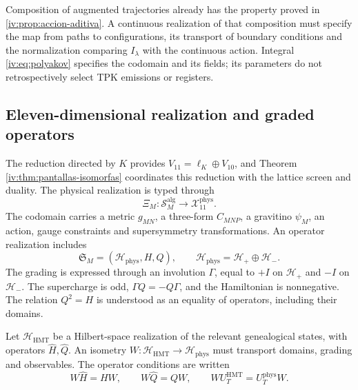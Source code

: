 Composition of augmented trajectories already has the
property proved in \ref{iv:prop:accion-aditiva}.
A continuous realization of that composition must
specify the map from paths to configurations,
its transport of boundary conditions and the
normalization comparing \(I_\lambda\) with the continuous
action. Integral \eqref{iv:eq:polyakov} specifies
the codomain and its fields; its parameters do not
retrospectively select TPK emissions or registers.

\subsection{Eleven-dimensional realization and graded operators}

The reduction directed by \(K\) provides
\(V_{11}=\ell_K\oplus V_{10}\), and Theorem
\ref{iv:thm:pantallas-isomorfas} coordinates this reduction
with the lattice screen and duality. The physical
realization is typed through
\[
 \Xi_M:\mathscr S_M^{\mathrm{alg}}
                  \longrightarrow\mathcal X_{11}^{\mathrm{phys}}.
\]
The codomain carries a metric \(g_{MN}\), a three-form
\(C_{MNP}\), a gravitino \(\psi_M\), an action,
gauge constraints and supersymmetry
transformations. An operator realization includes
\[
 \mathfrak S_M=(\mathcal H_{\mathrm{phys}},H,Q),\qquad
 \mathcal H_{\mathrm{phys}}=\mathcal H_+\oplus\mathcal H_-.
\]
The grading is expressed through an involution
\(\Gamma\), equal to \(+I\) on \(\mathcal H_+\)
and \(-I\) on \(\mathcal H_-\). The supercharge
is odd, \(\Gamma Q=-Q\Gamma\), and the
Hamiltonian is nonnegative. The relation
\(Q^2=H\) is understood as an equality of operators,
including their domains.

Let \(\mathcal H_{\mathrm{HMT}}\) be a Hilbert-space realization
of the relevant genealogical states,
with operators \(\widehat H,\widehat Q\). An
isometry \(W:\mathcal H_{\mathrm{HMT}}\to
\mathcal H_{\mathrm{phys}}\) must transport
domains, grading and observables. The operator
conditions are written
\begin{equation}
 W\widehat H=HW,\qquad
 W\widehat Q=QW,\qquad
 WU_T^{\mathrm{HMT}}=U_T^{\mathrm{phys}}W.
 \label{iv:eq:entrelazamiento-fisico}
\end{equation}

